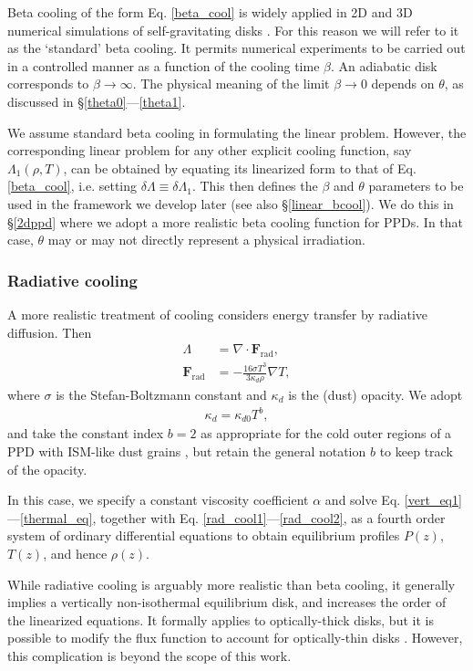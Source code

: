 Beta cooling of the form Eq. \ref{beta_cool} is widely applied in 2D
and 3D numerical simulations of self-gravitating disks \citep{gammie01,
  rice05,rice11}. For this reason we will refer to it as the
`standard' beta cooling. It permits numerical experiments to be
carried out in a controlled manner as a function of the cooling time
$\beta$. An adiabatic disk corresponds to $\beta\to \infty$. The
physical meaning of the limit $\beta\to0$ depends on $\theta$, as
discussed in \S\ref{theta0}---\ref{theta1}.  


We assume standard beta cooling in formulating the linear
problem. However, the corresponding linear problem for  
any other explicit cooling function, say $\Lambda_1(\rho,T)$, can be  
obtained by equating its linearized form to 
that of Eq. \ref{beta_cool}, i.e. setting $\delta \Lambda \equiv
\delta \Lambda_1$. This then defines the $\beta$ and $\theta$
parameters to be used in the framework we develop later (see also 
\S\ref{linear_bcool}). We do this in \S\ref{2dppd} where we adopt a  
more realistic beta cooling function for PPDs. In that case, $\theta$ 
may or may not directly represent a physical irradiation.     

\subsubsection{Radiative cooling}\label{rad_cool}
A more realistic treatment of cooling considers energy transfer by radiative diffusion. Then
\begin{align}
  \Lambda &= \nabla\cdot\bm{F}_\mathrm{rad},\label{rad_cool1}\\
  \bm{F}_\mathrm{rad}   &= -\frac{16\sigma T^3}{3\kappa_d\rho}\nabla T, \label{rad_cool2}
\end{align}
where $\sigma$ is the Stefan-Boltzmann constant and 
$\kappa_d$ is the (dust) opacity. We adopt
\begin{align}\label{opacity_law}
  \kappa_d = \kappa_{d0}T^b,
\end{align}
and take the constant index $b=2$ as appropriate for the cold outer regions
of a PPD with ISM-like dust grains \citep{bell94}, but retain the general notation $b$
to keep track of the opacity.    

In this case, we specify a constant viscosity coefficient $\alpha$ and
solve Eq. \ref{vert_eq1}---\ref{thermal_eq}, together with
Eq. \ref{rad_cool1}---\ref{rad_cool2}, as a fourth order system of
ordinary differential equations to obtain equilibrium profiles $P(z)$, $T(z)$, and hence
$\rho(z)$.  

While radiative cooling is arguably more realistic than
beta cooling, it generally implies a vertically
non-isothermal equilibrium disk, and increases the order of the
linearized equations. It formally applies to optically-thick 
disks, but it is possible to modify the flux function to account
for optically-thin disks \citep{levermore81}. However, this
complication is beyond the scope of this work. 


